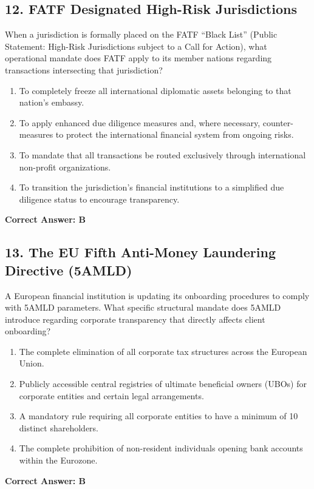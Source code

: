 \documentclass[11pt,a4paper]{article}
\begin{document}
	\subsection{12. FATF Designated High-Risk Jurisdictions}
	When a jurisdiction is formally placed on the FATF ``Black List'' (Public Statement: High-Risk Jurisdictions subject to a Call for Action), what operational mandate does FATF apply to its member nations regarding transactions intersecting that jurisdiction?
	\begin{enumerate}[label=\Alph*.]
		\item To completely freeze all international diplomatic assets belonging to that nation's embassy.
		\item To apply enhanced due diligence measures and, where necessary, counter-measures to protect the international financial system from ongoing risks.
		\item To mandate that all transactions be routed exclusively through international non-profit organizations.
		\item To transition the jurisdiction's financial institutions to a simplified due diligence status to encourage transparency.
	\end{enumerate}
	\textbf{Correct Answer: B}
	
	\subsection{13. The EU Fifth Anti-Money Laundering Directive (5AMLD)}
	A European financial institution is updating its onboarding procedures to comply with 5AMLD parameters. What specific structural mandate does 5AMLD introduce regarding corporate transparency that directly affects client onboarding?
	\begin{enumerate}[label=\Alph*.]
		\item The complete elimination of all corporate tax structures across the European Union.
		\item Publicly accessible central registries of ultimate beneficial owners (UBOs) for corporate entities and certain legal arrangements.
		\item A mandatory rule requiring all corporate entities to have a minimum of 10 distinct shareholders.
		\item The complete prohibition of non-resident individuals opening bank accounts within the Eurozone.
	\end{enumerate}
	\textbf{Correct Answer: B}
	
\end{document}
